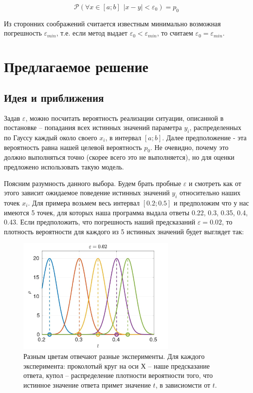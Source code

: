 \documentclass[a4paper,12pt]{article} %
\begin{document}
\begin{equation}
\mathcal{P}(\forall x \in [a;b] \hspace{5pt} |x - y| < \varepsilon_0) = p_0
\end{equation}

Из сторонних соображений считается известным минимально возможная погрешность $\varepsilon_{min}$, т.е. если метод выдает $\varepsilon_0 < \varepsilon_{min}$, то считаем $\varepsilon_0 = \varepsilon_{min}$.

\newpage

\section{Предлагаемое решение}

\subsection{Идея и приближения}

Задав $\varepsilon$, можно посчитать вероятность реализации ситуации, описанной в постановке -- попадания всех истинных значений параметра $y_i$, распределенных по Гауссу каждый около своего $x_i$, в интервал $[a;b]$. Далее предположение - эта вероятность равна нашей целевой вероятность $p_0$. Не очевидно, почему это должно выполняться точно (скорее всего это не выполняется), но для оценки предложено использовать такую модель. 

Поясним разумность данного выбора. Будем брать пробные $\varepsilon$ и смотреть как от этого зависит ожидаемое поведение истинных значений $y_i$ относительно наших точек $x_i$. Для примера возьмем весь интервал $[0.2; 0.5]$ и предположим что у нас имеются 5 точек, для которых наша программа выдала ответы 0.22, 0.3, 0.35, 0.4, 0.43. Если предположить, что погрешность наший предсказаний $\varepsilon = 0.02$, то плотность вероятности для каждого из 5 истинных значений будет выглядет так:

\begin{figure}[h!]
\begin{center}
\includegraphics[width=0.7\textwidth]{./pics/peaks_med}
\end{center}
\caption{Разным цветам отвечают разные эксперименты. Для каждого эксперимента: проколотый круг на оси Х -- наше предсказание ответа, купол -- распределение плотности вероятности того, что истинное значение ответа примет значение $t$, в зависиомсти от $t$.} \label{img:peaks_med}
\end{figure}
\end{document}
